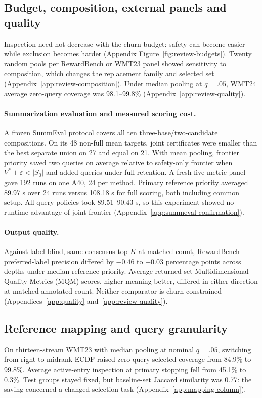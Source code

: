 \documentclass[11pt]{article}
\begin{document}
\subsection{Budget, composition, external panels and quality}
Inspection need not decrease with the churn budget: safety can become easier while exclusion becomes harder (Appendix Figure~\ref{fig:review-budgets}). Twenty random pools per RewardBench or WMT23 panel showed sensitivity to composition, which changes the replacement family and selected set (Appendix~\ref{app:review-composition}). Under median pooling at $q=.05$, WMT24 average zero-query coverage was 98.1--99.8\% (Appendix~\ref{app:review-quality}).

\paragraph{Summarization evaluation and measured scoring cost.}
A frozen SummEval \citep{fabbri-etal-2021-summeval} protocol covers all ten three-base/two-candidate compositions. On its 48 non-full mean targets, joint certificates were smaller than the best separate union on 27 and equal on 21. With mean pooling, frontier priority saved two queries on average relative to safety-only frontier when $V^*+\varepsilon<|S_0|$ and added queries under full retention. A fresh five-metric panel gave 192 runs on one A40, 24 per method. Primary reference priority averaged 89.97 s over 24 runs versus 108.18 s for full scoring, both including common setup. All query policies took 89.51--90.43 s, so this experiment showed no runtime advantage of joint frontier (Appendix~\ref{app:summeval-confirmation}).

\paragraph{Output quality.} Against label-blind, same-consensus top-$K$ at matched count, RewardBench preferred-label precision differed by $-0.46$ to $-0.03$ percentage points across depths under median reference priority. Average returned-set Multidimensional Quality Metrics (MQM) scores, higher meaning better, differed in either direction at matched annotated count. Neither comparator is churn-constrained (Appendices~\ref{app:quality} and~\ref{app:review-quality}).

\subsection{Reference mapping and query granularity}
\label{sec:query-granularity}
On thirteen-stream WMT23 with median pooling at nominal $q=.05$, switching from right to midrank ECDF raised zero-query selected coverage from 84.9\% to 99.8\%. Average active-entry inspection at primary stopping fell from 45.1\% to 0.3\%. Test groups stayed fixed, but baseline-set Jaccard similarity was 0.77: the saving concerned a changed selection task (Appendix~\ref{app:mapping-column}).
\end{document}
